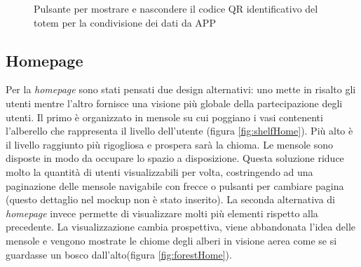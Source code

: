 \begin{figure} [h]
    \centering
    \vspace{1cm}
    \caption{Pulsante per mostrare e nascondere il codice QR identificativo del totem per la condivisione dei dati da APP}
    \label{fig:depositIconsQR}
\end{figure}
%
\subsection{Homepage}
Per la \textit{homepage} sono stati pensati due design alternativi: uno mette in risalto gli utenti mentre l'altro fornisce una visione più globale della partecipazione degli utenti.
Il primo è organizzato in mensole su cui poggiano i vasi contenenti l'alberello che rappresenta il livello dell'utente (figura \ref{fig:shelfHome}). Più alto è il livello raggiunto più rigogliosa e prospera sarà la chioma. Le mensole sono disposte in modo da occupare lo spazio a disposizione. Questa soluzione riduce molto la quantità di utenti visualizzabili per volta, costringendo ad una paginazione delle mensole navigabile con frecce o pulsanti per cambiare pagina (questo dettaglio nel mockup non è stato inserito).
La seconda alternativa di \textit{homepage} invece permette di visualizzare molti più elementi rispetto alla precedente. La visualizzazione cambia prospettiva, viene abbandonata l'idea delle mensole e vengono mostrate le chiome degli alberi in visione aerea come se si guardasse un bosco dall'alto(figura \ref{fig:forestHome}).

